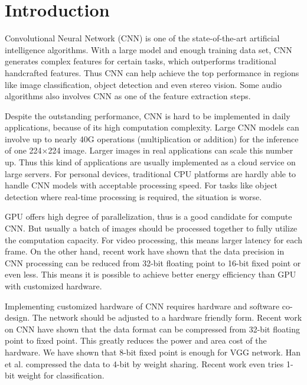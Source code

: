 \documentclass[10pt, conference, compsocconf]{IEEEtran}
\begin{document}
\section{Introduction} \label{sec:intro}
Convolutional Neural Network (CNN) is one of the state-of-the-art artificial intelligence algorithms. With a large model and enough training data set, CNN generates complex features for certain tasks, which outperforms traditional handcrafted features. Thus CNN can help achieve the top performance in regions like image classification, object detection and even stereo vision. Some audio algorithms also involves CNN as one of the feature extraction steps.

Despite the outstanding performance, CNN is hard to be implemented in daily applications, because of its high computation complexity. Large CNN models can involve up to nearly 40G operations (multiplication or addition) \cite{simonyan2014very} for the inference of one 224$\times$224 image. Larger images in real applications can scale this number up. Thus this kind of applications are usually implemented as a cloud service on large servers. For personal devices, traditional CPU platforms are hardly able to handle CNN models with acceptable processing speed. For tasks like object detection where real-time processing is required, the situation is worse.

GPU offers high degree of parallelization, thus is a good candidate for compute CNN. But usually a batch of images should be processed together to fully utilize the computation capacity. For video processing, this means larger latency for each frame. On the other hand, recent work have shown that the data precision in CNN processing can be reduced from 32-bit floating point to 16-bit fixed point or even less. This means it is possible to achieve better energy efficiency than GPU with customized hardware.

Implementing customized hardware of CNN requires hardware and software co-design. The network should be adjusted to a hardware friendly form. Recent work on CNN have shown that the data format can be compressed from 32-bit floating point to fixed point. This greatly reduces the power and area cost of the hardware. We have shown that 8-bit fixed point is enough for VGG network\cite{simonyan2014very}. Han et al.\cite{han2015learning} compressed the data to 4-bit by weight sharing. Recent work even tries 1-bit weight for classification\cite{Rastegari2016XNOR}.
\end{document}
